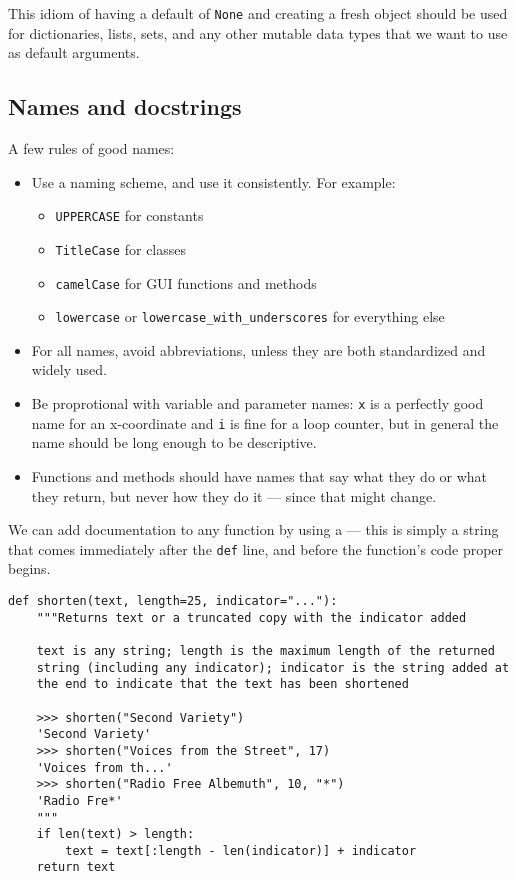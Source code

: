This idiom of having a default of \verb|None| and creating a fresh object should be used for dictionaries, lists, sets, and any other mutable data types that we want to use as default arguments.


\subsection{Names and docstrings}

\begin{tcolorbox}
  A few rules of good names:
  \begin{itemize}
  \item Use a naming scheme, and use it consistently.
    For example:
    \begin{itemize}
    \item \verb|UPPERCASE| for constants
    \item \verb|TitleCase| for classes
    \item \verb|camelCase| for GUI functions and methods
    \item \verb|lowercase| or \verb|lowercase_with_underscores| for everything else
    \end{itemize}
  \item For all names, avoid abbreviations, unless they are both standardized and widely used.
  \item Be proprotional with variable and parameter names: \verb|x| is a perfectly good name for an x-coordinate and \verb|i| is fine for a loop counter, but in general the name should be long enough to be descriptive.
  \item Functions and methods should have names that say what they do or what they return, but never how they do it --- since that might change.
  \end{itemize}
\end{tcolorbox}



We can add documentation to any function by using a  --- this is simply a string that comes immediately after the \verb|def| line, and before the function’s code proper begins.

\begin{lstlisting}
def shorten(text, length=25, indicator="..."):
    """Returns text or a truncated copy with the indicator added

    text is any string; length is the maximum length of the returned
    string (including any indicator); indicator is the string added at
    the end to indicate that the text has been shortened

    >>> shorten("Second Variety")
    'Second Variety'
    >>> shorten("Voices from the Street", 17)
    'Voices from th...'
    >>> shorten("Radio Free Albemuth", 10, "*")
    'Radio Fre*'
    """
    if len(text) > length:
        text = text[:length - len(indicator)] + indicator
    return text  
\end{lstlisting}

